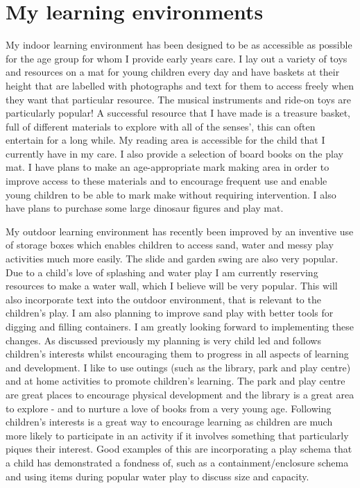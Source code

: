 \documentclass[10pt,a4paper]{report}
\begin{document}
\section{My learning environments}

My indoor learning environment has been designed to be as accessible as possible for the age group for whom I provide early years care. I lay out a variety of toys and resources on a mat for young children every day and have baskets at their height that are labelled with photographs and text for them to access freely when they want that particular resource. The musical instruments and ride-on toys are particularly popular! A successful resource that I have made is a treasure basket, full of different materials to explore with all of the senses', this can often entertain for a long while. My reading area is accessible for the child that I currently have in my care. I also provide a selection of board books on the play mat. I have plans to make an age-appropriate mark making area in order to improve access to these materials and to encourage frequent use and enable young children to be able to mark make without requiring intervention. I also have plans to purchase some large dinosaur figures and play mat. 

My outdoor learning environment has recently been improved by an inventive use of storage boxes which enables children to access sand, water and messy play activities much more easily. The slide and garden swing are also very popular. Due to a child's love of splashing and water play I am currently reserving resources to make a water wall, which I believe will be very popular. This will also incorporate text into the outdoor environment, that is relevant to the children's play. I am also planning to improve sand play with better tools for digging and filling containers. I am greatly looking forward to implementing these changes. As discussed previously my planning is very child led and follows children's interests whilst encouraging them to progress in all aspects of learning and development. I like to use outings (such as the library, park and play centre) and at home activities to promote children's learning. The park and play centre are great places to encourage physical development and the library is a great area to explore - and to nurture a love of books from a very young age. Following children's interests is a great way to encourage learning as children are much more likely to participate in an activity if it involves something that particularly piques their interest. Good examples of this are incorporating a play schema that a child has demonstrated a fondness of, such as a containment/enclosure schema and using items during popular water play to discuss size and capacity.
\end{document}
